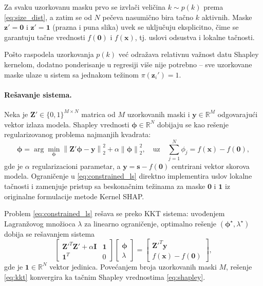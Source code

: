 Za svaku uzorkovanu masku prvo se izvlači veličina $k \sim p(k)$ prema
\eqref{eq:size_dist}, a zatim se od $N$ pečeva nasumično bira
tačno $k$ aktivnih. Maske $\mathbf{z}' = \mathbf{0}$ i $\mathbf{z}' =
\mathbf{1}$ (prazna i puna slika) uvek se uključuju eksplicitno, čime se
garantuju tačne vrednosti $f(\mathbf{0})$ i $f(\mathbf{x})$, tj. uslovi
odsustva i lokalne tačnosti.

Pošto raspodela uzorkovanja $p(k)$ već odražava relativnu važnost datu
Shapley kernelom, dodatno ponderisanje u regresiji više nije potrebno --
sve uzorkovane maske ulaze u sistem sa jednakom težinom
$\pi(\mathbf{z}_i') = 1$. 

\paragraph{Rešavanje sistema.}
Neka je $\mathbf{Z}' \in \{0,1\}^{M \times N}$ matrica od $M$ uzorkovanih
maski i $\mathbf{y} \in \mathbb{R}^M$ odgovarajući vektor izlaza modela.
Shapley vrednosti $\boldsymbol{\phi} \in \mathbb{R}^N$ dobijaju se kao
rešenje regularizovanog problema najmanjih kvadrata:
\begin{equation}
    \boldsymbol{\phi} = \arg\min_{\boldsymbol{\phi}}
    \left\lVert \mathbf{Z}' \boldsymbol{\phi} - \mathbf{y} \right\rVert_2^2
    + \alpha \left\lVert \boldsymbol{\phi} \right\rVert_2^2,
    \quad \text{uz} \quad \sum_{j=1}^{N} \phi_j = f(\mathbf{x}) - f(\mathbf{0}),
    \label{eq:constrained_ls}
\end{equation}
gde je $\alpha$ regularizacioni parametar, a $\mathbf{y} = 
\mathbf{s} - f(\mathbf{0})$ centrirani vektor skorova modela. Ograničenje
u \eqref{eq:constrained_ls} direktno implementira uslov lokalne tačnosti
i zamenjuje pristup sa beskonačnim težinama za maske $\mathbf{0}$ i
$\mathbf{1}$ iz originalne formulacije metode Kernel SHAP.

Problem \eqref{eq:constrained_ls} rešava se preko KKT sistema: uvođenjem
Lagranžovog množioca $\lambda$ za linearno ograničenje, optimalno rešenje
$(\boldsymbol{\phi}^\star, \lambda^\star)$ dobija se rešavanjem sistema
\begin{equation}
    \begin{bmatrix}
        \mathbf{Z}'^T \mathbf{Z}' + \alpha \mathbf{I} & \mathbf{1} \\
        \mathbf{1}^T & 0
    \end{bmatrix}
    \begin{bmatrix}
        \boldsymbol{\phi} \\ \lambda
    \end{bmatrix}
    =
    \begin{bmatrix}
        \mathbf{Z}'^T \mathbf{y} \\ f(\mathbf{x}) - f(\mathbf{0})
    \end{bmatrix},
    \label{eq:kkt}
\end{equation}
gde je $\mathbf{1} \in \mathbb{R}^N$ vektor jedinica. Povećanjem broja
uzorkovanih maski $M$, rešenje \eqref{eq:kkt} konvergira ka tačnim
Shapley vrednostima \eqref{eq:shapley}.

